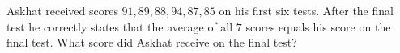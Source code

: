Askhat received scores $91, 89, 88, 94, 87, 85$ on his first six tests. After the final test he correctly states that the average of all $7$ scores equals his score on the final test. What score did Askhat receive on the final test?
